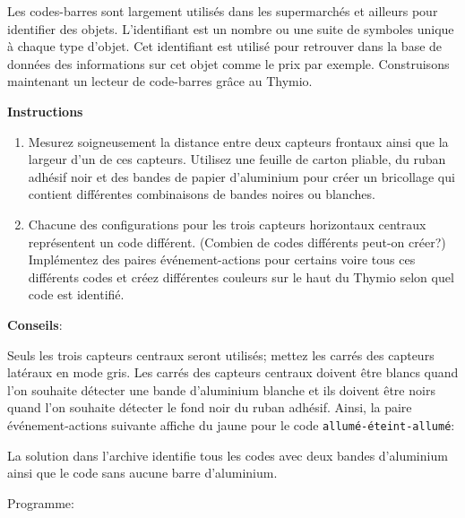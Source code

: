 \label{ch.barcode}

Les codes-barres sont largement utilisés dans les supermarchés et ailleurs pour identifier
des objets. L'identifiant est un nombre ou une suite de symboles unique à chaque type d'objet.
Cet identifiant est utilisé pour retrouver dans la base de données des informations sur
cet objet comme le prix par exemple.
Construisons maintenant un lecteur de code-barres grâce au Thymio.

\textbf{Instructions}

\begin{enumerate}
\item Mesurez soigneusement la distance entre deux capteurs frontaux ainsi que la largeur d'un de ces
    capteurs.
    Utilisez une feuille de carton pliable, du ruban adhésif noir et des bandes de papier d'aluminium
    pour créer un bricollage qui contient différentes combinaisons de bandes noires ou blanches.

\begin{center}
\end{center}

\item Chacune des configurations pour les trois capteurs horizontaux centraux
    représentent un code différent. (Combien de codes différents peut-on créer?)
    Implémentez des paires événement-actions pour certains voire tous ces différents codes
    et créez différentes couleurs sur le haut du Thymio selon quel code est identifié.

\end{enumerate}

\textbf{Conseils}:

Seuls les trois capteurs centraux seront utilisés; mettez les carrés des capteurs latéraux
en mode gris.
Les carrés des capteurs centraux doivent être blancs quand l'on souhaite détecter une bande d'aluminium blanche
et ils doivent être noirs quand l'on souhaite détecter le fond noir du ruban adhésif.
Ainsi, la paire événement-actions suivante affiche du jaune pour le code \texttt{allumé-éteint-allumé}:


La solution dans l'archive identifie tous les codes avec deux bandes d'aluminium ainsi que 
le code sans aucune barre d'aluminium.

{\raggedleft \hfill Programme: }
